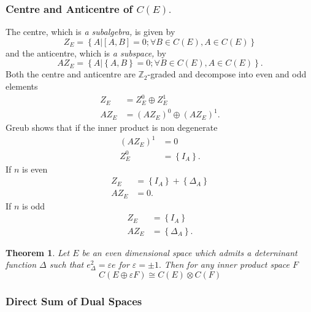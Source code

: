 \documentclass[aps,preprint]{revtex4}%
\newtheorem{theorem}{Theorem}
\begin{document}
\subsubsection{Centre and Anticentre of $C\left(  E\right)  .$}

The centre, which is \emph{a subalgebra,} is given by
\begin{equation}
Z_{E}=\left\{  A\left\vert \left[  A,B\right]  =0;\forall B\in C\left(
E\right)  ,A\in C\left(  E\right)  \right.  \right\}
\end{equation}
and the anticentre, which is \emph{a subspace,} by%
\begin{equation}
AZ_{E}=\left\{  A\left\vert \left\{  A,B\right\}  =0;\forall B\in C\left(
E\right)  ,A\in C\left(  E\right)  \right.  \right\}  .
\end{equation}
Both the centre and anticentre are $\mathbb{Z}_{2}$-graded and decompose into
even and odd elements
\begin{align}
Z_{E}  &  =Z_{E}^{0}\oplus Z_{E}^{1}\\
AZ_{E}  &  =\left(  AZ_{E}\right)  ^{0}\oplus\left(  AZ_{E}\right)  ^{1}.
\end{align}
Greub shows that if the inner product is non degenerate
\begin{align}
\left(  AZ_{E}\right)  ^{1}  &  =0\\
Z_{E}^{0}  &  =\left\{  I_{A}\right\}  .
\end{align}
If $n$ is even
\begin{align}
Z_{E}  &  =\left\{  I_{A}\right\}  +\left\{  \Delta_{A}\right\} \\
AZ_{E}  &  =0.
\end{align}
If $n$ is odd
\begin{align}
Z_{E}  &  =\left\{  I_{A}\right\} \\
AZ_{E}  &  =\left\{  \Delta_{A}\right\}  .
\end{align}


\begin{theorem}
Let $E$ be an even dimensional space which admits a deterninant function
$\Delta$ such that $e_{\Delta}^{2}=\varepsilon e$ for $\varepsilon=\pm1.$ Then
for any inner product space $F$%
\begin{equation}
C\left(  E\oplus\varepsilon F\right)  \cong C\left(  E\right)  \otimes
C\left(  F\right)
\end{equation}

\end{theorem}

\subsubsection{Direct Sum of Dual Spaces}
\end{document}
